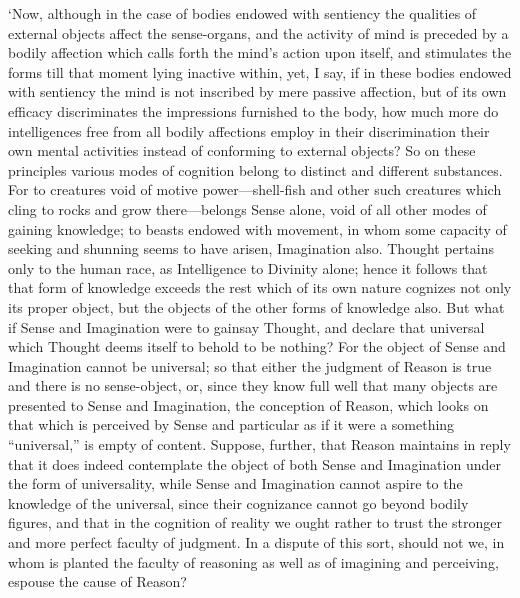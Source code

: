 \documentclass[12pt]{book}
\begin{document}
`Now, although in the case of bodies endowed with sentiency the
qualities of external objects affect the sense-organs, and the activity
of mind is preceded by a bodily affection which calls forth the mind's
action upon itself, and stimulates the forms till that moment lying
inactive within, yet, I say, if in these bodies endowed with sentiency
the mind is not inscribed by mere passive affection, but of its own
efficacy discriminates the impressions furnished to the body, how much
more do intelligences free from all bodily affections employ in their
discrimination their own mental activities instead of conforming to
external objects? So on these principles various modes of cognition
belong to distinct and different substances. For to creatures void of
motive power---shell-fish and other such creatures which cling to rocks
and grow there---belongs Sense alone, void of all other modes of gaining
knowledge; to beasts endowed with movement, in whom some capacity of
seeking and shunning seems to have arisen, Imagination also. Thought
pertains only to the human race, as Intelligence to Divinity alone;
hence it follows that that form of knowledge exceeds the rest which of
its own nature cognizes not only its proper object, but the objects of
the other forms of knowledge also. But what if Sense and Imagination
were to gainsay Thought, and declare that universal which Thought deems
itself to behold to be nothing? For the object of Sense and Imagination
cannot be universal; so that either the judgment of Reason is true and
there is no sense-object, or, since they know full well that many
objects are presented to Sense and Imagination, the conception of
Reason, which looks on that which is perceived by Sense and particular
as if it were a something ``universal,'' is empty of content. Suppose,
further, that Reason maintains in reply that it does indeed contemplate
the object of both Sense and Imagination under the form of
universality, while Sense and Imagination cannot aspire to the
knowledge of the universal, since their cognizance cannot go beyond
bodily figures, and that in the cognition of reality we ought rather to
trust the stronger and more perfect faculty of judgment. In a dispute of
this sort, should not we, in whom is planted the faculty of reasoning as
well as of imagining and perceiving, espouse the cause of Reason?
\end{document}

